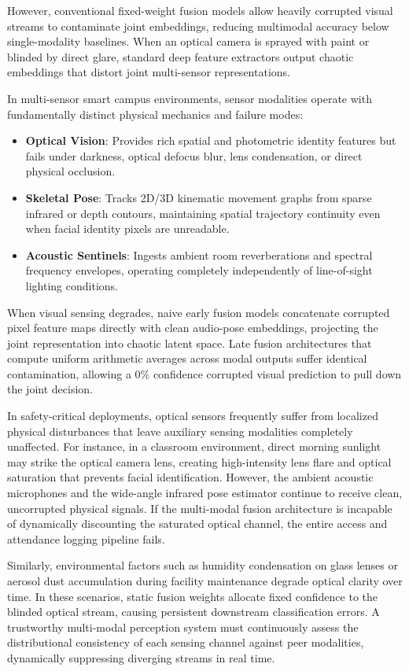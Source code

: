 \documentclass[conference]{IEEEtran}
\begin{document}
However, conventional fixed-weight fusion models allow heavily corrupted visual streams to contaminate joint embeddings, reducing multimodal accuracy below single-modality baselines. When an optical camera is sprayed with paint or blinded by direct glare, standard deep feature extractors output chaotic embeddings that distort joint multi-sensor representations.

In multi-sensor smart campus environments, sensor modalities operate with fundamentally distinct physical mechanics and failure modes:
\begin{itemize}
    \item \textbf{Optical Vision}: Provides rich spatial and photometric identity features but fails under darkness, optical defocus blur, lens condensation, or direct physical occlusion.
    \item \textbf{Skeletal Pose}: Tracks 2D/3D kinematic movement graphs from sparse infrared or depth contours, maintaining spatial trajectory continuity even when facial identity pixels are unreadable.
    \item \textbf{Acoustic Sentinels}: Ingests ambient room reverberations and spectral frequency envelopes, operating completely independently of line-of-sight lighting conditions.
\end{itemize}

When visual sensing degrades, naive early fusion models concatenate corrupted pixel feature maps directly with clean audio-pose embeddings, projecting the joint representation into chaotic latent space. Late fusion architectures that compute uniform arithmetic averages across modal outputs suffer identical contamination, allowing a 0\% confidence corrupted visual prediction to pull down the joint decision.

In safety-critical deployments, optical sensors frequently suffer from localized physical disturbances that leave auxiliary sensing modalities completely unaffected. For instance, in a classroom environment, direct morning sunlight may strike the optical camera lens, creating high-intensity lens flare and optical saturation that prevents facial identification. However, the ambient acoustic microphones and the wide-angle infrared pose estimator continue to receive clean, uncorrupted physical signals. If the multi-modal fusion architecture is incapable of dynamically discounting the saturated optical channel, the entire access and attendance logging pipeline fails.

Similarly, environmental factors such as humidity condensation on glass lenses or aerosol dust accumulation during facility maintenance degrade optical clarity over time. In these scenarios, static fusion weights allocate fixed confidence to the blinded optical stream, causing persistent downstream classification errors. A trustworthy multi-modal perception system must continuously assess the distributional consistency of each sensing channel against peer modalities, dynamically suppressing diverging streams in real time.
\end{document}
